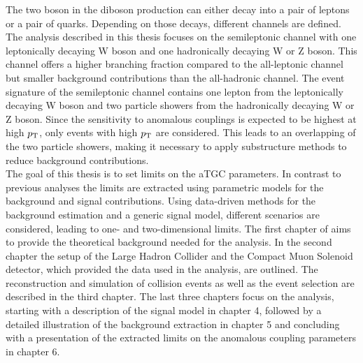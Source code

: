 The two boson in the diboson production can either decay into a pair of leptons or a pair of quarks. Depending on those decays, different channels are defined. The analysis described in this thesis focuses on the semileptonic channel with one leptonically decaying W boson and one hadronically decaying W or Z boson. This channel offers a higher branching fraction compared to the all-leptonic channel but smaller background contributions than the all-hadronic channel. The event signature of the semileptonic channel contains one lepton from the leptonically decaying W boson and two particle showers from the hadronically decaying W or Z boson. Since the sensitivity to anomalous couplings is expected to be highest at high $p_{\rm T}$, only events with high $p_{\rm T}$ are considered. This leads to an overlapping of the two particle showers, making it necessary to apply substructure methods to reduce background contributions. \\

The goal of this thesis is to set limits on the aTGC parameters. In contrast to previous analyses the limits are extracted using parametric models for the background and signal contributions. Using data-driven methods for the background estimation and a generic signal model, different scenarios are considered, leading to one- and two-dimensional limits. The first chapter of aims to provide the theoretical background needed for the analysis. In the second chapter the setup of the Large Hadron Collider and the Compact Muon Solenoid detector, which provided the data used in the analysis, are outlined. The reconstruction and simulation of collision events as well as the event selection are described in the third chapter. The last three chapters focus on the analysis, starting with a description of the signal model in chapter 4, followed by a detailed illustration of the background extraction in chapter 5 and concluding with a presentation of the extracted limits on the anomalous coupling parameters in chapter 6.





